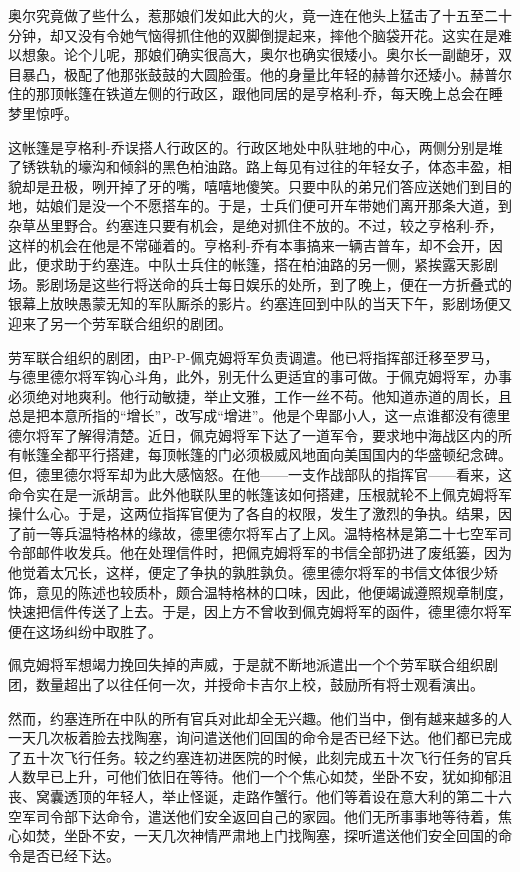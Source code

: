     奥尔究竟做了些什么，惹那娘们发如此大的火，竟一连在他头上猛击了十五至二十分钟，却又没有令她气恼得抓住他的双脚倒提起来，摔他个脑袋开花。这实在是难以想象。论个儿呢，那娘们确实很高大，奥尔也确实很矮小。奥尔长一副龅牙，双目暴凸，极配了他那张鼓鼓的大圆脸蛋。他的身量比年轻的赫普尔还矮小。赫普尔住的那顶帐篷在铁道左侧的行政区，跟他同居的是亨格利-乔，每天晚上总会在睡梦里惊呼。
 


    这帐篷是亨格利-乔误搭人行政区的。行政区地处中队驻地的中心，两侧分别是堆了锈铁轨的壕沟和倾斜的黑色柏油路。路上每见有过往的年轻女子，体态丰盈，相貌却是丑极，咧开掉了牙的嘴，嘻嘻地傻笑。只要中队的弟兄们答应送她们到目的地，姑娘们是没一个不愿搭车的。于是，士兵们便可开车带她们离开那条大道，到杂草丛里野合。约塞连只要有机会，是绝对抓住不放的。不过，较之亨格利-乔，这样的机会在他是不常碰着的。亨格利-乔有本事搞来一辆吉普车，却不会开，因此，便求助于约塞连。中队士兵住的帐篷，搭在柏油路的另一侧，紧挨露天影剧场。影剧场是这些行将送命的兵士每日娱乐的处所，到了晚上，便在一方折叠式的银幕上放映愚蒙无知的军队厮杀的影片。约塞连回到中队的当天下午，影剧场便又迎来了另一个劳军联合组织的剧团。

    劳军联合组织的剧团，由P-P-佩克姆将军负责调遣。他已将指挥部迁移至罗马，与德里德尔将军钩心斗角，此外，别无什么更适宜的事可做。于佩克姆将军，办事必须绝对地爽利。他行动敏捷，举止文雅，工作一丝不苟。他知道赤道的周长，且总是把本意所指的“增长”，改写成“增进”。他是个卑鄙小人，这一点谁都没有德里德尔将军了解得清楚。近日，佩克姆将军下达了一道军令，要求地中海战区内的所有帐篷全都平行搭建，每顶帐篷的门必须极威风地面向美国国内的华盛顿纪念碑。但，德里德尔将军却为此大感恼怒。在他——一支作战部队的指挥官——看来，这命令实在是一派胡言。此外他联队里的帐篷该如何搭建，压根就轮不上佩克姆将军操什么心。于是，这两位指挥官便为了各自的权限，发生了激烈的争执。结果，因了前一等兵温特格林的缘故，德里德尔将军占了上风。温特格林是第二十七空军司令部邮件收发兵。他在处理信件时，把佩克姆将军的书信全部扔进了废纸篓，因为他觉着太冗长，这样，便定了争执的孰胜孰负。德里德尔将军的书信文体很少矫饰，意见的陈述也较质朴，颇合温特格林的口味，因此，他便竭诚遵照规章制度，快速把信件传送了上去。于是，因上方不曾收到佩克姆将军的函件，德里德尔将军便在这场纠纷中取胜了。

    佩克姆将军想竭力挽回失掉的声威，于是就不断地派遣出一个个劳军联合组织剧团，数量超出了以往任何一次，并授命卡吉尔上校，鼓励所有将士观看演出。
 


    然而，约塞连所在中队的所有官兵对此却全无兴趣。他们当中，倒有越来越多的人一天几次板着脸去找陶塞，询问遣送他们回国的命令是否已经下达。他们都已完成了五十次飞行任务。较之约塞连初进医院的时候，此刻完成五十次飞行任务的官兵人数早已上升，可他们依旧在等待。他们一个个焦心如焚，坐卧不安，犹如抑郁沮丧、窝囊透顶的年轻人，举止怪诞，走路作蟹行。他们等着设在意大利的第二十六空军司令部下达命令，遣送他们安全返回自己的家园。他们无所事事地等待着，焦心如焚，坐卧不安，一天几次神情严肃地上门找陶塞，探听遣送他们安全回国的命令是否已经下达。

